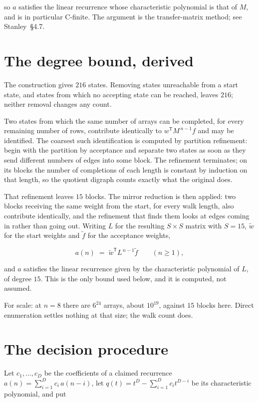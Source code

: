 \documentclass[11pt]{article}
\theoremstyle{definition}
\begin{document}
so $a$ satisfies the linear recurrence whose characteristic polynomial is that of $M$, and is in particular C-finite. The argument is the transfer-matrix method; see Stanley~\S4.7.

\section{The degree bound, derived}

The construction gives $216$ states. Removing states unreachable from a start state, and states from which no accepting state can be reached, leaves $216$; neither removal changes any count.

Two states from which the same number of arrays can be completed, for every remaining number of rows, contribute identically to $w^{\mathsf T}M^{\,n-1}f$ and may be identified. The coarsest such identification is computed by partition refinement: begin with the partition by acceptance and separate two states as soon as they send different numbers of edges into some block. The refinement terminates; on its blocks the number of completions of each length is constant by induction on that length, so the quotient digraph counts exactly what the original does.

That refinement leaves $15$ blocks. The mirror reduction is then applied: two blocks receiving the same weight from the start, for every walk length, also contribute identically, and the refinement that finds them looks at edges coming in rather than going out. Writing $L$ for the resulting $S \times S$ matrix with $S = 15$, $\tilde w$ for the start weights and $\tilde f$ for the acceptance weights,

\[a(n) \;=\; \tilde w^{\mathsf T} L^{\,n-1} \tilde f \qquad (n \ge 1),\]

and $a$ satisfies the linear recurrence given by the characteristic polynomial of $L$, of degree $15$. This is the only bound used below, and it is computed, not assumed.

For scale: at $n = 8$ there are $6^{24}$ arrays, about $10^{19}$, against $15$ blocks here. Direct enumeration settles nothing at that size; the walk count does.

\section{The decision procedure}

Let $c_1,\dots,c_D$ be the coefficients of a claimed recurrence $a(n) = \sum_{i=1}^{D} c_i\,a(n-i)$, let $q(t) = t^{D} - \sum_{i=1}^{D} c_i t^{D-i}$ be its characteristic polynomial, and put
\end{document}
